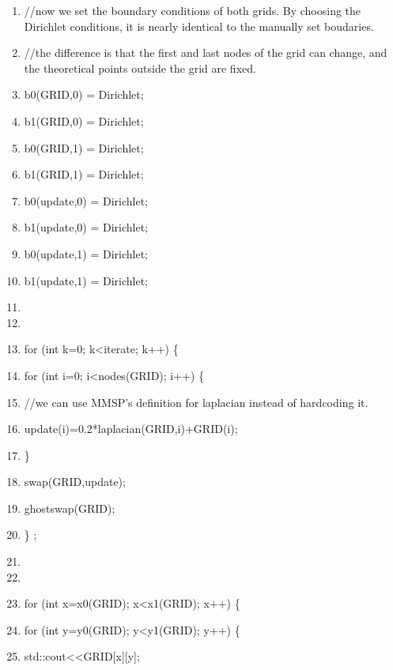 \documentclass[10pt]{article}
\begin{document}
\begin{shadebox}
\begin{enumerate} \itemsep1pt \parskip0pt 
\setcounter{enumi}{35}
\item //now we set the boundary conditions of both grids.  By choosing the Dirichlet conditions, it is nearly identical to the manually set boudaries.  
\item //the difference is that the first and last nodes of the grid can change, and the theoretical points outside the grid are fixed.
\item b0(GRID,0) = Dirichlet;
\item b1(GRID,0) = Dirichlet;
\item b0(GRID,1) = Dirichlet;
\item b1(GRID,1) = Dirichlet;
\item b0(update,0) = Dirichlet;
\item b1(update,0) = Dirichlet;
\item b0(update,1) = Dirichlet;
\item b1(update,1) = Dirichlet;
\item 
\item 
\item for (int k=0; k\textless iterate; k++) \{
\item \hspace{10pt}         for (int i=0; i\textless nodes(GRID); i++) \{
\item //we can use MMSP's definition for laplacian instead of hardcoding it.
\item \hspace{10pt} \hspace{10pt}                 update(i)=0.2*laplacian(GRID,i)+GRID(i);
\item \hspace{10pt}         \}
\item \hspace{10pt}         swap(GRID,update);
\item \hspace{10pt}         ghostswap(GRID);
\item \} ;
\item 
\item 
\item for (int x=x0(GRID); x\textless x1(GRID); x++) \{
\item \hspace{10pt}         for (int y=y0(GRID); y\textless y1(GRID); y++) \{
\item \hspace{10pt} \hspace{10pt}         std::cout\textless \textless GRID[x][y];

\end{enumerate}
\end{shadebox}
\end{document}

